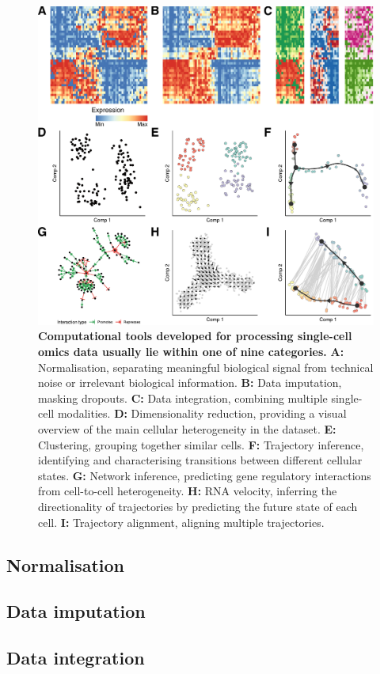 \begin{figure}[htb!]
	\centering
	\includegraphics[width=.75\linewidth]{fig/comptools/comptools_3.pdf} 
	\caption{
		\textbf{Computational tools developed for processing single-cell omics data usually lie within one of nine categories.}
		\textbf{A:} Normalisation, separating meaningful biological signal from technical noise or irrelevant biological information.
		\textbf{B:} Data imputation, masking dropouts.
		\textbf{C:} Data integration, combining multiple single-cell modalities.
		\textbf{D:} Dimensionality reduction, providing a visual overview of the main cellular heterogeneity in the dataset.
		\textbf{E:} Clustering, grouping together similar cells.
		\textbf{F:} Trajectory inference, identifying and characterising transitions between different cellular states.
		\textbf{G:} Network inference, predicting gene regulatory interactions from cell-to-cell heterogeneity.
		\textbf{H:} RNA velocity, inferring the directionality of trajectories by predicting the future state of each cell.
		\textbf{I:} Trajectory alignment, aligning multiple trajectories.
	}
	\label{fig:comp_tools}
\end{figure}

\subsection{Normalisation}

\subsection{Data imputation}

\subsection{Data integration}

